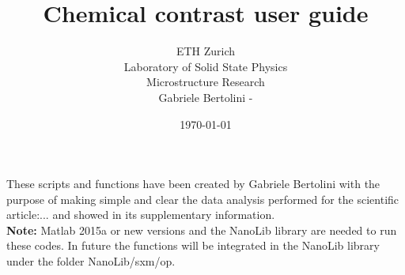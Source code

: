 


\newcommand{\mcode}[1]{\texttt{>\.> #1}}

\renewcommand{\familydefault}{\sfdefault}
\setlength\parindent{0pt}

\newcommand{\+}[1]{\item \textbf{#1}}

\newcommand{\nanonis}{\href{http://www.specs-zurich.com/en/home.html;jsessionid=FCD8A587EE447665C3F4A8CC374671EE}{Nanonis SPM Control System\texttrademark}}
\newcommand{\matlab}{MATLAB\texttrademark}


\title{Chemical contrast user guide}
\author{
ETH Zurich\\
Laboratory of Solid State Physics\\\vspace{.5em}
Microstructure Research\\ 
{\small Gabriele Bertolini - }
}
\date{\today}


\maketitle
These scripts and functions have been created by Gabriele Bertolini with the purpose of making simple and clear the data analysis performed for the scientific article:... and showed in its supplementary information.\\
\textbf{Note:} Matlab 2015a or new versions and the NanoLib library are needed to run these codes.
In future the functions will be integrated in the NanoLib library under the folder NanoLib/sxm/op. 
\newpage
\tableofcontents


%

